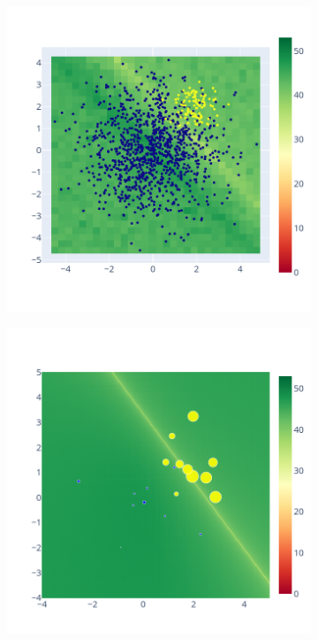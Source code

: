 \documentclass[11pt]{article}
\begin{document}
\begin{figure}
\begin{subfigure}{.3\linewidth}
    \includegraphics[width=\linewidth]{figure/SVM/non_weighted.png}
    \caption{}
    \label{fig:SVM_nw_sig}
    \end{subfigure}
    \begin{subfigure}{.3\linewidth}
    \includegraphics[width=\linewidth]{figure/Weighted/non_weighted.png}

\end{subfigure}
\end{figure}
\end{document}
